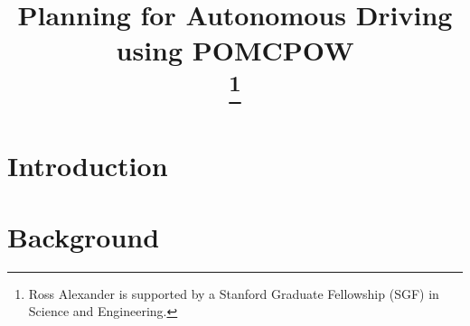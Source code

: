 \documentclass[conference]{IEEEtran}
\begin{document}
\title{\LARGE \textbf{Planning for Autonomous Driving using POMCPOW} \\
\thanks{Ross Alexander is supported by a Stanford Graduate Fellowship (SGF) in Science and Engineering.}}


\author{
} %


\maketitle

\begin{abstract}
\end{abstract}


\section{Introduction}


\section{Background}

\cite{Bouton2019Cooperation-AwareTraffic}
\end{document}

